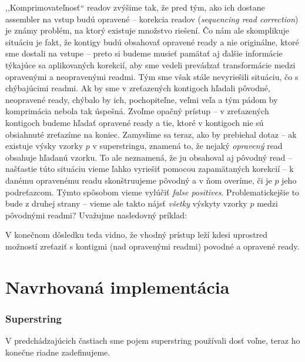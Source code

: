 ,,Komprimovateľnosť`` readov zvýšime tak, že pred tým, ako ich dostane assembler na vstup budú opravené -- korekcia readov (\emph{sequencing read correction}) je známy problém, na ktorý existuje množstvo riešení.  Čo nám ale skomplikuje situáciu je fakt, že kontigy budú obsahovať opravené ready a nie originálne, ktoré sme dostali na vstupe -- preto si budeme musieť pamätať aj ďalšie informácie týkajúce sa aplikovaných korekcií, aby sme vedeli prevádzať transformácie medzi opravenými a neopravenými readmi. Tým sme však stále nevyriešili situáciu, čo s chýbajúcimi readmi. Ak by sme v zreťazených kontigoch hľadali pôvodné, neopravené ready, chýbalo by ich, pochopiteľne, veľmi veľa a tým pádom by komprimácia nebola tak úspešná. Zvoľme opačný prístup -- v zreťazených kontigoch budeme hľadať opravené ready a tie, ktoré v kontigoch nie sú obsiahnuté zreťazíme na koniec. Zamyslime sa teraz, ako by prebiehal dotaz -- ak existuje výsky vzorky $p$ v superstringu, znamená to, že nejaký \emph{opravený} read obsahuje hľadanú vzorku. To ale neznamená, že ju obsahoval aj pôvodný read -- našťastie túto situáciu vieme ľahko vyriešiť pomocou zapamätaných korekcií -- k danému opravenému readu skonštruujeme pôvodný a v ňom overíme, či je $p$ jeho podreťazcom. Týmto spôsobom vieme vylúčiť \emph{false positives}. Problematickejšie to bude z druhej strany -- vieme ale takto nájsť \emph{všetky} výskyty vzorky $p$ medzi pôvodnými readmi? Uvažujme nasledovný príklad:


V konečnom dôsledku teda vidno, že vhodný prístup leží kdesi uprostred možností zreťaziť s kontigmi (nad opravenými readmi) povodné a opravené ready.

\section{Navrhovaná implementácia}

\subsubsection{Superstring}
V predchádzajúcich častiach sme pojem superstring používali dosť voľne, teraz ho konečne riadne zadefinujeme.

